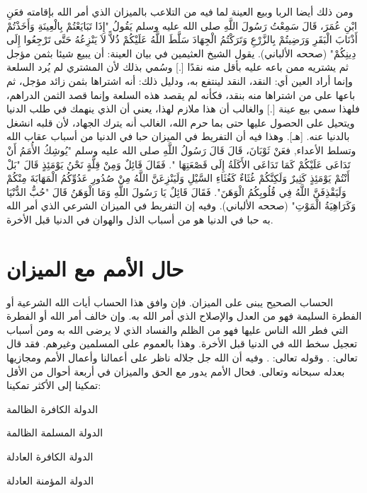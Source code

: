ومن ذلك أيضا الربا وبيع العينة لما فيه من التلاعب بالميزان الذي أمر الله بإقامته فعَنِ ابْنِ عُمَرَ، قَالَ سَمِعْتُ رَسُولَ اللَّهِ صلى الله عليه وسلم يَقُولُ "إِذَا تَبَايَعْتُمْ بِالْعِينَةِ وَأَخَذْتُمْ أَذْنَابَ الْبَقَرِ وَرَضِيتُمْ بِالزَّرْعِ وَتَرَكْتُمُ الْجِهَادَ سَلَّطَ اللَّهُ عَلَيْكُمْ ذُلاًّ لاَ يَنْزِعُهُ حَتَّى تَرْجِعُوا إِلَى دِينِكُمْ" {\footnotesize (صححه الألباني)}. يقول الشيخ العثيمين في بيان العينة:
أن يبيع شيئا بثمن مؤجل ثم يشتريه ممن باعه عليه بأقل منه نقدًا [.] وسُمي بذلك لأن المشتري لم يُرد السلعة وإنما أراد العين أي: النقد، النقد لينتفع به، ودليل ذلك: أنه اشتراها بثمن زائد مؤجل، ثم باعها على من اشتراها منه بنقد، فكأنه لم يقصد هذه السلعة وإنما قصد الثمن الدراهم، فلهذا سمي بيع عينة [.] والغالب أن هذا ملازم لهذا، يعني أن الذي ينهمك في طلب الدنيا ويتحيل على الحصول عليها حتى بما حرم الله، الغالب أنه يترك الجهاد، لأن قلبه انشغل بالدنيا عنه.
[هـ]. وهذا فيه أن التفريط في الميزان حبا في الدنيا من أسباب عقاب الله وتسلط الأعداء, فعَنْ ثَوْبَانَ، قَالَ قَالَ رَسُولُ اللَّهِ صلى الله عليه وسلم "يُوشِكُ الأُمَمُ أَنْ تَدَاعَى عَلَيْكُمْ كَمَا تَدَاعَى الأَكَلَةُ إِلَى قَصْعَتِهَا ". فَقَالَ قَائِلٌ وَمِنْ قِلَّةٍ نَحْنُ يَوْمَئِذٍ قَالَ "بَلْ أَنْتُمْ يَوْمَئِذٍ كَثِيرٌ وَلَكِنَّكُمْ غُثَاءٌ كَغُثَاءِ السَّيْلِ وَلَيَنْزِعَنَّ اللَّهُ مِنْ صُدُورِ عَدُوِّكُمُ الْمَهَابَةَ مِنْكُمْ وَلَيَقْذِفَنَّ اللَّهُ فِي قُلُوبِكُمُ الْوَهَنَ". فَقَالَ قَائِلٌ يَا رَسُولَ اللَّهِ وَمَا الْوَهَنُ قَالَ "حُبُّ الدُّنْيَا وَكَرَاهِيَةُ الْمَوْتِ" {\footnotesize (صححه الألباني)}. وفيه إن التفريط في الميزان الشرعي الذي أمر الله به حبا في الدنيا هو من أسباب الذل والهوان في الدنيا قبل الأخرة.

\section{حال الأمم مع الميزان}

الحساب الصحيح يبنى على الميزان. فإن وافق هذا الحساب أيات الله الشرعية أو الفطرة السليمة فهو من العدل والإصلاح الذي أمر الله به. وإن خالف أمر الله أو الفطرة التي فطر الله الناس عليها فهو من الظلم والفساد الذي لا يرضى الله به ومن أسباب تعجيل سخط الله في الدنيا قبل الأخرة. وهذا بالعموم على المسلمين وغيرهم. فقد قال تعالى:
\quranayah*[11][117]{\footnotesize \surahname*[11]}.
وقوله تعالى:
\quranayah*[10][13-14]{\footnotesize \surahname*[10]}.
وفيه أن الله جل جلاله ناظر على أعمالنا وأعمال الأمم ومجازيها بعدله سبحانه وتعالى. فحال الأمم يدور مع الحق والميزان في أربعة أحوال من الأقل تمكينا إلى الأكثر تمكينا:

\begin{compactitem}
    \item الدولة الكافرة الظالمة
    \item الدولة المسلمة الظالمة
    \item الدولة الكافرة العادلة
    \item الدولة المؤمنة العادلة
\end{compactitem}

